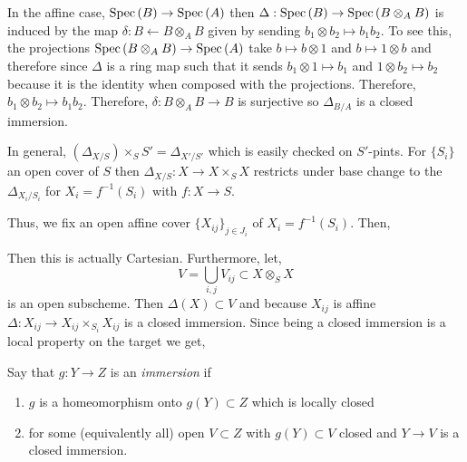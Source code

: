 \documentclass[12pt]{article}
\begin{document}
\begin{rmk}
In the affine case, $\mathrm{Spec}\left( B \right) \to \mathrm{Spec}\left( A \right)$ then $\Delta : \mathrm{Spec}\left( B \right) \to \mathrm{Spec}\left( B \otimes_A B \right)$ is induced by the map $\delta : B \leftarrow B \otimes_A B$ given by sending $b_1 \otimes b_2 \mapsto b_1 b_2$. To see this, the projections $\mathrm{Spec}\left( B \otimes_A B \right) \to \mathrm{Spec}\left( A \right)$ take $b \mapsto b \otimes 1$ and $b \mapsto 1 \otimes b$ and therefore since $\Delta$ is a ring map such that it sends $b_1 \otimes 1 \mapsto b_1$ and $1 \otimes b_2 \mapsto b_2$ because it is the identity when composed with the projections. Therefore, $b_1 \otimes b_2 \mapsto b_1 b_2$. Therefore, $\delta : B \otimes_A B \to B$ is surjective so $\Delta_{B/A}$ is a closed immersion.
\end{rmk}

\begin{rmk}
In general, $(\Delta_{X/S}) \times_S S' = \Delta_{X'/S'}$ which is easily checked on $S'$-pints. For $\{ S_i \}$ an open cover of $S$ then $\Delta_{X/S} : X \to X \times_S X$ restricts under base change to the $\Delta_{X_i/S_i}$ for $X_i = f^{-1}(S_i)$ with $f : X \to S$.
\end{rmk}
\noindent
Thus, we fix an open affine cover $\{ X_{ij} \}_{j \in J_i}$ of $X_i = f^{-1}(S_i)$. Then,
\begin{center}
\end{center}
Then this is actually Cartesian. Furthermore, let,
\[ V = \bigcup_{i,j} V_{ij} \subset X \otimes_S X \]
is an open subscheme. Then $\Delta(X) \subset V$ and because $X_{ij}$ is affine $\Delta : X_{ij} \to X_{ij} \times_{S_i} X_{ij}$ is a closed immersion. Since being a closed immersion is a local property on the target we get,
\begin{center}
\end{center}

\begin{defn}
Say that $g : Y \to Z$ is an \textit{immersion} if
\begin{enumerate}
\item $g$ is a homeomorphism onto $g(Y) \subset Z$ which is locally closed
\item for some (equivalently all)  open $V \subset Z$ with $g(Y) \subset V$ closed and $Y \to V$ is a closed immersion.
\end{enumerate}
\end{defn}
\end{document}
